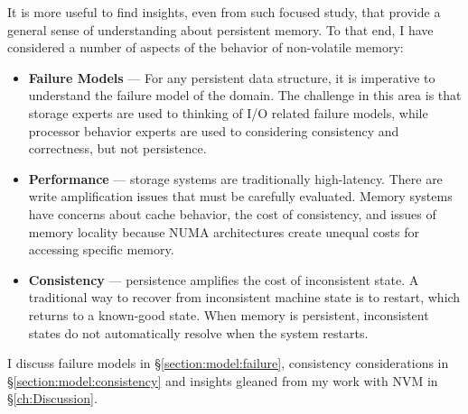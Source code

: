 It is more useful to find insights, even from such focused study, that provide a general sense of understanding
about persistent memory.  To that end, I have considered a number of aspects of the behavior of non-volatile
memory:

\begin{itemize}
    \item \textbf{Failure Models} --- For any persistent data structure, it is imperative to understand the failure
    model of the domain. The challenge in this area is that storage experts are used to thinking of I/O related
    failure models, while processor behavior experts are used to considering consistency and correctness, but not
    persistence.

    \item \textbf{Performance} --- storage systems are traditionally high-latency.  There are write amplification
    issues that must be carefully evaluated.  Memory systems have concerns about cache behavior, the cost of
    consistency, and issues of memory locality because \acs{NUMA} architectures create unequal costs for accessing
    specific memory.

    \item \textbf{Consistency} --- persistence amplifies the cost of inconsistent state.  A traditional way to 
    recover from inconsistent machine state is to restart, which returns to a known-good state.  When memory
    is persistent, inconsistent states do not automatically resolve when the system restarts.

\end{itemize}

I discuss failure models in \S \ref{section:model:failure}, consistency considerations in \S \ref{section:model:consistency} and insights gleaned from my work with \acs{NVM} in \S \ref{ch:Discussion}.

\endinput

Any text after an \endinput is ignored.
You could put scraps here or things in progress.

%

This document provides a quick set of instructions for using the
\class{ubcdiss} class to write a dissertation in \LaTeX. 
Unfortunately this document cannot provide an introduction to using
\LaTeX.  The classic reference for learning \LaTeX\ is
\citeauthor{lamport-1994-ladps}'s
book~\cite{lamport-1994-ladps}.  There are also many freely-available
tutorials online;
\webref{http://www.andy-roberts.net/misc/latex/}{Andy Roberts' online
    \LaTeX\ tutorials}
seems to be excellent.
The source code for this docment, however, is intended to serve as
an example for creating a \LaTeX\ version of your dissertation.

